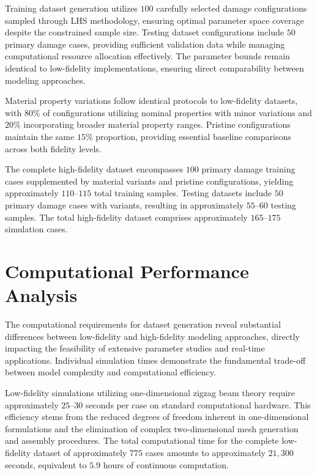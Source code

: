 \documentclass[12pt,a4paper]{report}
\begin{document}
Training dataset generation utilizes $100$ carefully selected damage configurations sampled through LHS methodology, ensuring optimal parameter space coverage despite the constrained sample size. Testing dataset configurations include $50$ primary damage cases, providing sufficient validation data while managing computational resource allocation effectively. The parameter bounds remain identical to low-fidelity implementations, ensuring direct comparability between modeling approaches.

Material property variations follow identical protocols to low-fidelity datasets, with $80\%$ of configurations utilizing nominal properties with minor variations and $20\%$ incorporating broader material property ranges. Pristine configurations maintain the same $15\%$ proportion, providing essential baseline comparisons across both fidelity levels.

The complete high-fidelity dataset encompasses $100$ primary damage training cases supplemented by material variants and pristine configurations, yielding approximately $110$--$115$ total training samples. Testing datasets include $50$ primary damage cases with variants, resulting in approximately $55$--$60$ testing samples. The total high-fidelity dataset comprises approximately $165$--$175$ simulation cases.

\section{Computational Performance Analysis}

The computational requirements for dataset generation reveal substantial differences between low-fidelity and high-fidelity modeling approaches, directly impacting the feasibility of extensive parameter studies and real-time applications. Individual simulation times demonstrate the fundamental trade-off between model complexity and computational efficiency.

Low-fidelity simulations utilizing one-dimensional zigzag beam theory require approximately $25$--$30$ seconds per case on standard computational hardware. This efficiency stems from the reduced degrees of freedom inherent in one-dimensional formulations and the elimination of complex two-dimensional mesh generation and assembly procedures. The total computational time for the complete low-fidelity dataset of approximately $775$ cases amounts to approximately $21,300$ seconds, equivalent to $5.9$ hours of continuous computation.
\end{document}
